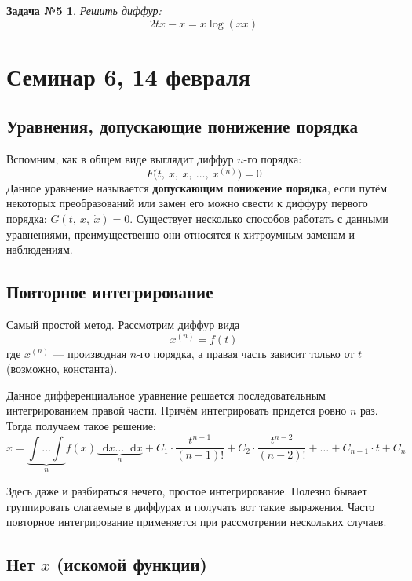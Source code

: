 \documentclass[a4paper,12pt]{article}
\newtheorem*{task5}{Задача №5}
\renewcommand*\d{\mathop{}\!\mathrm{d}}
\newcommand{\dx}{\dot{x}}
\newcommand{\ds}{\displaystyle}
\begin{document}
\begin{task5}
	Решить диффур:
	\[2t\dx - x = \dx\log(x\dx)\]
\end{task5}
%	

\newpage
\section{Семинар 6, 14 февраля}

\subsection{Уравнения, допускающие понижение порядка}

Вспомним, как в общем виде выглядит диффур $n$-го порядка:
\[F\big(t,\ x,\ \dx,\ \ldots,\ x^{(n)}\big) = 0\]
Данное уравнение называется \textbf{допускающим понижение порядка}, если путём некоторых преобразований или замен его можно свести к диффуру первого порядка: $G(t,\ x,\ \dx) = 0$. Существует несколько способов работать с данными уравнениями, преимущественно они относятся к хитроумным заменам и наблюдениям.

\subsection{Повторное интегрирование}

Самый простой метод. Рассмотрим диффур вида
\[x^{(n)} = f(t)\] где $x^{(n)}$ --- производная $n$-го порядка, а правая часть зависит только от $t$ (возможно, константа).

Данное дифференциальное уравнение решается последовательным интегрированием правой части. Причём интегрировать придется ровно $n$ раз. Тогда получаем такое решение:
\[x = \underbrace{\ds\int\ldots\ds\int}_{n}f(x)\underbrace{\d x \ldots\d x}_{n} + C_1\cdot \dfrac{t^{n - 1}}{(n - 1)!} + C_2\cdot \dfrac{t^{n - 2}}{(n - 2)!} + \ldots + C_{n - 1}\cdot t + C_n\]

Здесь даже и разбираться нечего, простое интегрирование. Полезно бывает группировать слагаемые в диффурах и получать вот такие выражения. Часто повторное интегрирование применяется при рассмотрении нескольких случаев.

\subsection{Нет $x$ (искомой функции)}
\end{document}
